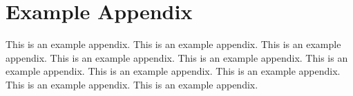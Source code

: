 \chapter{Example Appendix}
\label{appB}

This is an example appendix. This is an example appendix. This is an example appendix. This is an example appendix. This is an example appendix. This is an example appendix. This is an example appendix. This is an example appendix. This is an example appendix. This is an example appendix.

